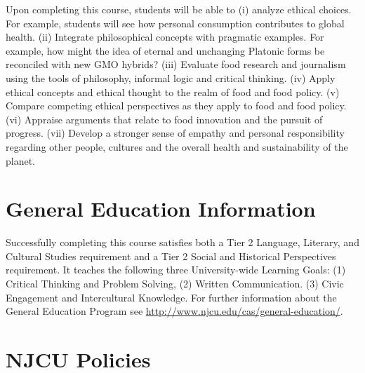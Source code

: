 \documentclass[article,oneside]{memoir}
\begin{document}
Upon completing this course, students will be able to (i) analyze ethical choices. For example, students will see how personal consumption contributes to global health. (ii) Integrate philosophical concepts with pragmatic examples. For example, how might the idea of eternal and unchanging Platonic forms be reconciled with new GMO hybrids? (iii) Evaluate food research and journalism using the tools of philosophy, informal logic and critical thinking. (iv) Apply ethical concepts and ethical thought to the realm of food and food policy. (v) Compare competing ethical perspectives as they apply to food and food policy. (vi) Appraise arguments that relate to food innovation and the pursuit of progress. (vii)  Develop a stronger sense of empathy and personal responsibility regarding other people, cultures and the overall health and sustainability of the planet.


\section{General Education Information} 
Successfully completing this course satisfies both a Tier 2 Language, Literary, and Cultural Studies requirement and a Tier 2  Social and Historical Perspectives requirement. It teaches the following three University-wide Learning Goals: (1) Critical Thinking and Problem Solving, (2) Written Communication. (3) Civic Engagement and Intercultural Knowledge. For further information about the General Education Program see \href{http://www.njcu.edu/cas/general-education/}{http://www.njcu.edu/cas/general-education/}.









\section{NJCU Policies}
\end{document}
